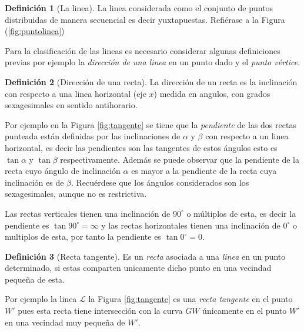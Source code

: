 \documentclass[
  16pt,
]{krantz}
\theoremstyle{definition}
\newtheorem{definition}{Definición}[chapter]
\theoremstyle{definition}
\theoremstyle{definition}
\theoremstyle{definition}
\theoremstyle{remark}
\begin{document}
\begin{definition}[La linea]
\protect\hypertarget{def:linea}{}{\label{def:linea} {} }La linea considerada como el conjunto de puntos distribuidas de manera secuencial es decir yuxtapuestas. Refiérase a la Figura (\ref{fig:puntolinea})
\end{definition}

Para la clasificación de las lineas es necesario considerar algunas definiciones previas por ejemplo la \emph{dirección de una linea} en un punto dado y el \emph{punto vértice}.

\begin{definition}[Dirección de una recta]
\protect\hypertarget{def:direccionrecta}{}{\label{def:direccionrecta} {} }La dirección de un recta es la inclinación con respecto a una linea horizontal (eje \(x\)) medida en angulos, con grados sexagesimales en sentido antihorario.
\end{definition}

Por ejemplo en la Figura \ref{fig:tangente} se tiene que la \emph{pendiente} de las dos rectas punteada están definidas por las inclinaciones de \(\alpha\) y \(\beta\) con respecto a un linea horizontal, es decir las pendientes son las tangentes de estos ángulos esto es \(\tan \alpha\) y \(\tan \beta\) respectivamente. Además se puede observar que la pendiente de la recta cuyo ángulo de inclinación \(\alpha\) es mayor a la pendiente de la recta cuya inclinación es de \(\beta\). Recuérdese que los ángulos considerados son los sexagesimales, aunque no es restrictiva.

Las rectas verticales tienen una inclinación de \(90^\circ\) o múltiplos de esta, es decir la pendiente es \(\tan 90^\circ=\infty\) y las rectas horizontales tienen una inclinación de \(0^\circ\) o multiplos de esta, por tanto la pendiente es \(\tan 0^\circ=0\).

\begin{definition}[Recta tangente]
\protect\hypertarget{def:tangentew}{}{\label{def:tangentew} {} }Es un \emph{recta} asociada a una \emph{linea} en un punto determinado, si estas comparten unicamente dicho punto en una vecindad pequeña de esta.
\end{definition}

Por ejemplo la linea \(\mathcal{L}\) la Figura \ref{fig:tangente} es una \emph{recta tangente} en el punto \(W'\) pues esta recta tiene intersección con la curva \(GW\) únicamente en el punto \(W'\) en una vecindad muy pequeña de \(W'\).
\end{document}
